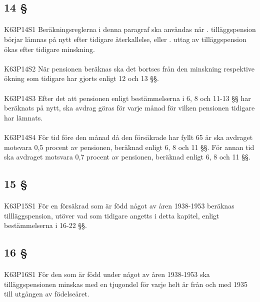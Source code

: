 \documentclass[a4paper,notitlepage,openany,10pt]{book}
\begin{document}
\subsection*{14 §}
\paragraph*{}
{\tiny K63P14S1}
Beräkningsreglerna i denna paragraf ska användas när
. tilläggspension börjar lämnas på nytt efter tidigare återkallelse, eller
. uttag av tilläggspension ökas efter tidigare minskning.
\paragraph*{}
{\tiny K63P14S2}
När pensionen beräknas ska det bortses från den minskning respektive ökning som tidigare har gjorts enligt 12 och 13 §§.
\paragraph*{}
{\tiny K63P14S3}
Efter det att pensionen enligt bestämmelserna i 6, 8 och 11-13 §§ har beräknats på nytt, ska avdrag göras för varje månad för vilken pensionen tidigare har lämnats.
\paragraph*{}
{\tiny K63P14S4}
För tid före den månad då den försäkrade har fyllt 65 år ska avdraget motsvara 0,5 procent av pensionen, beräknad enligt 6, 8 och 11 §§. För annan tid ska avdraget motsvara 0,7 procent av pensionen, beräknad enligt 6, 8 och 11 §§.
\subsection*{15 §}
\paragraph*{}
{\tiny K63P15S1}
För en försäkrad som är född något av åren 1938-1953 beräknas tillläggspension, utöver vad som tidigare angetts i detta kapitel, enligt bestämmelserna i 16-22 §§.
\subsection*{16 §}
\paragraph*{}
{\tiny K63P16S1}
För den som är född under något av åren 1938-1953 ska tilläggspensionen minskas med en tjugondel för varje helt år från och med 1935 till utgången av födelseåret.
\end{document}
